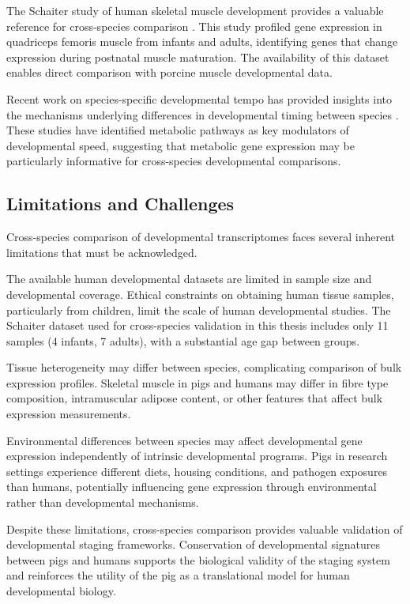 The Schaiter study of human skeletal muscle development provides a valuable reference for cross-species comparison \parencite{schaiter_molecular_2024}. This study profiled gene expression in quadriceps femoris muscle from infants and adults, identifying genes that change expression during postnatal muscle maturation. The availability of this dataset enables direct comparison with porcine muscle developmental data.

Recent work on species-specific developmental tempo has provided insights into the mechanisms underlying differences in developmental timing between species \parencite{iwata_metabolic_2024}. These studies have identified metabolic pathways as key modulators of developmental speed, suggesting that metabolic gene expression may be particularly informative for cross-species developmental comparisons.

\subsection{Limitations and Challenges}

Cross-species comparison of developmental transcriptomes faces several inherent limitations that must be acknowledged.

The available human developmental datasets are limited in sample size and developmental coverage. Ethical constraints on obtaining human tissue samples, particularly from children, limit the scale of human developmental studies. The Schaiter dataset \parencite{schaiter_molecular_2024} used for cross-species validation in this thesis includes only 11 samples (4 infants, 7 adults), with a substantial age gap between groups.

Tissue heterogeneity may differ between species, complicating comparison of bulk expression profiles. Skeletal muscle in pigs and humans may differ in fibre type composition, intramuscular adipose content, or other features that affect bulk expression measurements.

Environmental differences between species may affect developmental gene expression independently of intrinsic developmental programs. Pigs in research settings experience different diets, housing conditions, and pathogen exposures than humans, potentially influencing gene expression through environmental rather than developmental mechanisms.

Despite these limitations, cross-species comparison provides valuable validation of developmental staging frameworks. Conservation of developmental signatures between pigs and humans supports the biological validity of the staging system and reinforces the utility of the pig as a translational model for human developmental biology.


